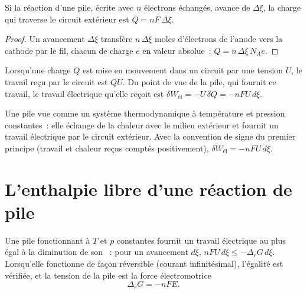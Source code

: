 \begin{proposition}\label{prop:b2:cell-thermodynamics:charge}
Si la réaction d'une pile, écrite avec $n$ électrons échangés, avance de
$\Delta\xi$, la charge qui traverse le circuit extérieur est $Q =
nF\,\Delta\xi$.
\end{proposition}

\begin{proof}
Un avancement $\Delta\xi$ transfère $n\,\Delta\xi$ moles d'électrons de
l'anode vers la cathode par le fil, chacun de charge $e$ en valeur absolue~:
$Q = n\,\Delta\xi\,N_A e$.
\end{proof}

Lorsqu'une charge $Q$ est mise en mouvement dans un circuit par une tension $U$, le travail
reçu par le circuit est $QU$. Du point de vue de la pile, qui fournit ce travail,
le travail électrique qu'elle reçoit est $\delta W_{\text{él}} = -U\,\delta Q = -nFU\,
d\xi$.

\begin{omfigure}

{\small Une pile vue comme un système thermodynamique à température et pression constantes~:
elle échange de la chaleur avec le milieu extérieur et fournit un travail électrique par
le circuit extérieur. Avec la convention de signe du premier principe (travail et chaleur
reçus comptés positivement), $\delta W_{\text{él}} = -nFU\,d\xi$.}
\end{omfigure}

\section{L'enthalpie libre d'une réaction de pile}

\begin{theorem}\label{thm:b2:cell-thermodynamics:delta-g-nfe}
Une pile fonctionnant à $T$ et $p$ constantes fournit un travail électrique au plus
égal à la diminution de son ~: pour un avancement $d\xi$,
$nFU\,d\xi \leq -\Delta_r G\,d\xi$. Lorsqu'elle fonctionne de façon réversible (courant
infinitésimal), l'égalité est vérifiée, et la tension de la pile est la
force électromotrice
\[
  \Delta_r G = -nFE .
\]
\end{theorem}

